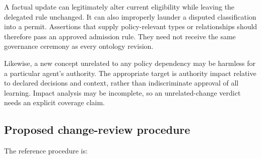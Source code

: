 \documentclass[
  english,
  12pt,
  a4paper,
  preprint,
  numbers,
  nopreprintline]{elsarticle}
\begin{document}
A factual update can legitimately alter current eligibility while
leaving the delegated rule unchanged. It can also improperly launder a
disputed classification into a permit. Assertions that supply
policy-relevant types or relationships should therefore pass an approved
admission rule. They need not receive the same governance ceremony as
every ontology revision.

Likewise, a new concept unrelated to any policy dependency may be
harmless for a particular agent's authority. The appropriate target is
authority impact relative to declared decisions and context, rather than
indiscriminate approval of all learning. Impact analysis may be
incomplete, so an unrelated-change verdict needs an explicit coverage
claim.

\subsection{Proposed change-review
procedure}\label{proposed-change-review-procedure}

The reference procedure is:
\end{document}
